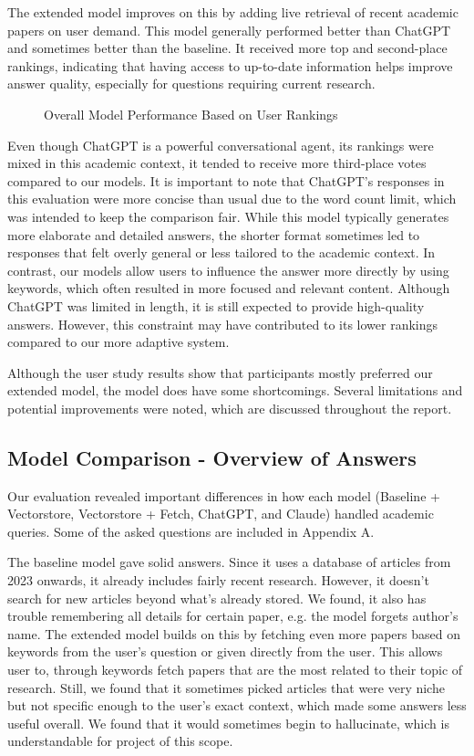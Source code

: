 \documentclass[fleqn,moreauthors,10pt]{ds_report}
\begin{document}
The extended model improves on this by adding live retrieval of recent academic papers on user demand. This model generally performed better than ChatGPT and sometimes better than the baseline. It received more top and second-place rankings, indicating that having access to up-to-date information helps improve answer quality, especially for questions requiring current research.


\begin{figure}[htbp]
    \centering
    
    \caption{Overall Model Performance Based on User Rankings}
    \label{fig:summary}
\end{figure}

Even though ChatGPT is a powerful conversational agent, its rankings were mixed in this academic context, it tended to receive more third-place votes compared to our models. It is important to note that ChatGPT’s responses in this evaluation were more concise than usual due to the word count limit, which was intended to keep the comparison fair. While this model typically generates more elaborate and detailed answers, the shorter format sometimes led to responses that felt overly general or less tailored to the academic context. In contrast, our models allow users to influence the answer more directly by using keywords, which often resulted in more focused and relevant content. Although ChatGPT was limited in length, it is still expected to provide high-quality answers. However, this constraint may have contributed to its lower rankings compared to our more adaptive system.

Although the user study results show that participants mostly preferred our extended model, the model does have some shortcomings. Several limitations and potential improvements were noted, which are discussed throughout the report.

\subsection*{Model Comparison - Overview of Answers}

Our evaluation revealed important differences in how each model (Baseline + Vectorstore, Vectorstore + Fetch, ChatGPT, and Claude) handled academic queries. Some of the asked questions are included in Appendix A.

The baseline model gave solid answers. Since it uses a database of articles from 2023 onwards, it already includes fairly recent research. However, it doesn’t search for new articles beyond what’s already stored. We found, it also has trouble remembering all details for certain paper, e.g. the model forgets author's name. The extended model builds on this by fetching even more papers based on keywords from the user's question or given directly from the user. This allows user to, through keywords fetch papers that are the most related to their topic of research. Still, we found that it sometimes picked articles that were very niche but not specific enough to the user's exact context, which made some answers less useful overall. We found that it would sometimes begin to hallucinate, which is understandable for project of this scope.
\end{document}
